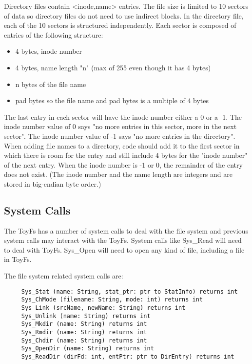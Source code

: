 \documentclass[12pt]{article}
\begin{document}
Directory files contain <inode,name> entries.  The file size is
limited to 10 sectors of data so directory files do not need to use
indirect blocks.  In the directory file, each of the 10 sectors is
structured independently.  Each sector is composed of entries of the
following structure:
 \begin{itemize}
  \item 4 bytes, inode number
  \item 4 bytes, name length "n" (max of 255 even though it has 4 bytes)
  \item n bytes of the file name
  \item	pad bytes so the file name and pad bytes is a multiple of 4 bytes
 \end{itemize}

The last entry in each sector will have the inode number either a 0 or
a -1.  The inode number value of 0 says "no more entries in this
sector, more in the next sector".  The inode number value of -1 says
"no more entries in the directory".  When adding file names to a
directory, code should add it to the first sector in which there is
room for the entry and still include 4 bytes for the "inode number" of
the next entry.  When the inode number is -1 or 0, the remainder of
the entry does not exist.  (The inode number and the name length are
integers and are stored in big-endian byte order.)

\subsection{System Calls}

The ToyFs has a number of system calls to deal with the file system
and previous system calls may interact with the ToyFs.  System calls like
Sys\_Read will need to deal with ToyFs.  Sys\_Open will need to open
any kind of file, including a file in ToyFs.

The file system related system calls are:
 \begin{verbatim}
     Sys_Stat (name: String, stat_ptr: ptr to StatInfo) returns int
     Sys_ChMode (filename: String, mode: int) returns int
     Sys_Link (srcName, newName: String) returns int
     Sys_Unlink (name: String) returns int
     Sys_Mkdir (name: String) returns int
     Sys_Rmdir (name: String) returns int
     Sys_Chdir (name: String) returns int
     Sys_OpenDir (name: String) returns int
     Sys_ReadDir (dirFd: int, entPtr: ptr to DirEntry) returns int
\end{verbatim}
\end{document}
